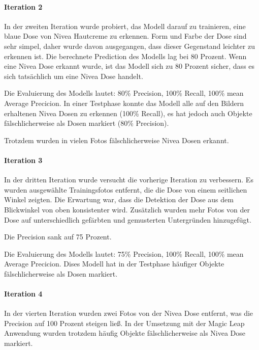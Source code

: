 \paragraph{Iteration 2}

In der zweiten Iteration wurde probiert, das Modell darauf zu trainieren, eine blaue Dose von Nivea Hautcreme zu erkennen. Form und Farbe der Dose sind sehr simpel, daher wurde davon ausgegangen, dass dieser Gegenstand leichter zu erkennen ist. Die berechnete Prediction des Modells lag bei 80 Prozent. Wenn eine Nivea Dose erkannt wurde, ist das Modell sich zu 80 Prozent sicher, dass es sich tatsächlich um eine Nivea Dose handelt.

Die Evaluierung des Modells lautet: 80\% Precision, 100\% Recall, 100\% mean Average Precicion.
In einer Testphase konnte das Modell alle auf den Bildern erhaltenen Nivea Dosen zu erkennen (100\% Recall), es hat jedoch auch Objekte fälschlicherweise als Dosen markiert (80\% Precision).

Trotzdem wurden in vielen Fotos fälschlicherweise Nivea Dosen erkannt. 


\paragraph{Iteration 3}

In der dritten Iteration wurde versucht die vorherige Iteration zu verbessern. Es wurden ausgewählte Trainingsfotos entfernt, die die Dose von einem seitlichen Winkel zeigten. Die Erwartung war, dass die Detektion der Dose aus dem Blickwinkel von oben konsistenter wird. Zusätzlich wurden mehr Fotos von der Dose auf unterschiedlich gefärbten und gemusterten Untergründen hinzugefügt. 

Die Precision sank auf 75 Prozent.

Die Evaluierung des Modells lautet: 75\% Precision, 100\% Recall, 100\% mean Average Precicion.
Dises Modell hat in der Testphase häufiger Objekte fälschlicherweise als Dosen markiert.

\paragraph{Iteration 4}

In der vierten Iteration wurden zwei Fotos von der Nivea Dose entfernt, was die Precision auf 100 Prozent steigen ließ. In der Umsetzung mit der Magic Leap Anwendung wurden trotzdem häufig Objekte fälschlicherweise als Nivea Dose markiert.

